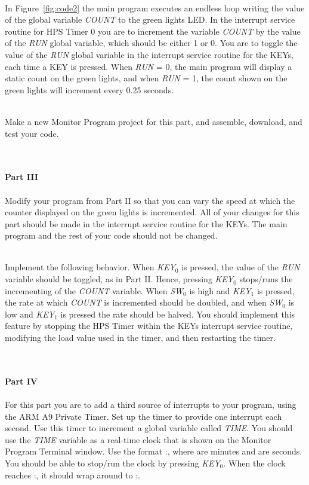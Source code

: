 \documentclass[epsfig,10pt,fullpage]{article}
\begin{document}
~\\
\noindent
In Figure~\ref{fig:code2} the main program executes an endless loop writing the value of
the global variable {\it COUNT} to the green lights LED.  In the interrupt service routine for 
HPS Timer 0 you are to increment the variable {\it COUNT} by the value of 
the {\it RUN} global variable, 
which should be either 1 or 0.  You are to toggle the value of the {\it RUN} global variable 
in the interrupt service routine for the KEYs, each time a KEY is pressed.
When {\it RUN} = 0, the main program will display a static count on the green lights,
and when {\it RUN} = 1, the count shown on the green lights will increment every 0.25 seconds.

~\\
\noindent
Make a new Monitor Program project for this part, and assemble, download, and test your
code.

~\\
~\\
\noindent
{\bf Part III}
~\\
~\\
\noindent
Modify your program from Part II so that you can vary the speed at which the counter
displayed on the green lights is incremented. All of your changes for this part should be made
in the interrupt service routine for the KEYs. The main program and the rest of
your code should not be changed.

~\\
\noindent
Implement the following behavior. When {\it KEY}$_0$ is pressed, the value of the {\it RUN}
variable should be toggled, as in Part II. Hence, pressing {\it KEY}$_0$ stops/runs
the incrementing of the {\it COUNT} variable. 
When {\it SW}$_0$ is high and {\it KEY}$_1$ is pressed, the rate at which
{\it COUNT} is incremented should be doubled, and when {\it SW}$_0$ is 
low and {\it KEY}$_1$ is pressed the
rate should be halved. You should implement this feature by stopping the HPS Timer within
the KEYs interrupt service routine, modifying the load value used in the
timer, and then restarting the timer.

~\\
~\\
\noindent
{\bf Part IV}
~\\
~\\
\noindent
For this part you are to add a third source of interrupts to your program, using the ARM A9
Private Timer. Set up the timer to provide one interrupt each second. Use this
timer to increment a global variable called {\it TIME}. You should use the {\it TIME} variable as
a real-time clock that is shown on the Monitor Program Terminal window. Use the format 
:, where  are minutes and  are seconds.
You should be able to stop/run the clock by pressing {\it KEY}$_0$.
When the clock reaches :, it should wrap around to :.
\end{document}
